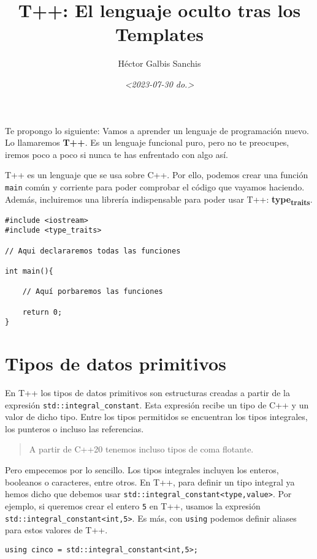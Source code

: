 \documentclass[11pt]{article}
\author{Héctor Galbis Sanchis}
\date{\textit{<2023-07-30 do.>}}
\title{T++: El lenguaje oculto tras los Templates}
\begin{document}
\maketitle
\tableofcontents

Te propongo lo siguiente: Vamos a aprender un lenguaje de programación nuevo. Lo llamaremos \textbf{T++}. Es un lenguaje funcional puro, pero no te preocupes, iremos poco a poco si nunca te has enfrentado con algo así.

T++ es un lenguaje que se usa sobre C++. Por ello, podemos crear una función \texttt{main} común y corriente para poder comprobar el código que vayamos haciendo. Además, incluiremos una librería indispensable para poder usar T++: \textbf{type\textsubscript{traits}}.

\begin{verbatim}
#include <iostream>
#include <type_traits>

// Aqui declararemos todas las funciones

int main(){

	// Aquí porbaremos las funciones

	return 0;
}
\end{verbatim}

\section{Tipos de datos primitivos}
\label{sec:orgad5b708}
En T++ los tipos de datos primitivos son estructuras creadas a partir de la expresión \texttt{std::integral\_constant}. Esta expresión recibe un tipo de C++ y un valor de dicho tipo. Entre los tipos permitidos se encuentran los tipos integrales, los punteros o incluso las referencias.

\begin{quote}
A partir de C++20 tenemos incluso tipos de coma flotante.
\end{quote}

Pero empecemos por lo sencillo. Los tipos integrales incluyen los enteros, booleanos o caracteres, entre otros. En T++, para definir un tipo integral ya hemos dicho que debemos usar \texttt{std::integral\_constant<type,value>}. Por ejemplo, si queremos crear el entero \texttt{5} en T++, usamos la expresión \texttt{std::integral\_constant<int,5>}. Es más, con \texttt{using} podemos definir aliases para estos valores de T++.

\begin{verbatim}
using cinco = std::integral_constant<int,5>;
\end{verbatim}
\end{document}
